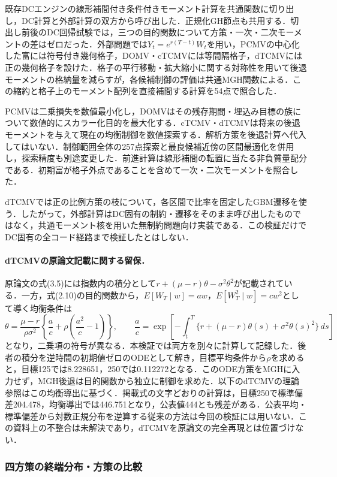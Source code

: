 \documentclass[10pt,a4paper]{article}
\theoremstyle{plain}
\theoremstyle{definition}
\begin{document}
既存DCエンジンの線形補間付き条件付きモーメント計算を共通関数に切り出し，DC計算と外部計算の双方から呼び出した．正規化GH節点も共用する．切出し前後のDC回帰試験では，三つの目的関数について方策・一次・二次モーメントの差はゼロだった．外部問題では$Y_t=e^{r(T-t)}W_t$を用い，PCMVの中心化した富には符号付き幾何格子，DOMV・cTCMVには等間隔格子，dTCMVには正の幾何格子を設けた．格子の平行移動・拡大縮小に関する対称性を用いて後退モーメントの格納量を減らすが，各候補制御の評価は共通MGH関数による．この縮約と格子上のモーメント配列を直接補間する計算を54点で照合した．

PCMVは二乗損失を数値最小化し，DOMVはその残存期間・埋込み目標の族について数値的にスカラー化目的を最大化する．cTCMV・dTCMVは将来の後退モーメントを与えて現在の均衡制御を数値探索する．解析方策を後退計算へ代入してはいない．制御範囲全体の257点探索と最良候補近傍の区間最適化を併用し，探索精度も別途変更した．前進計算は線形補間の転置に当たる非負質量配分である．初期富が格子外点であることを含めて一次・二次モーメントを照合した．

dTCMVでは正の比例方策の枝について，各区間で比率を固定したGBM遷移を使う．したがって，外部計算はDC固有の制約・遷移をそのまま呼び出したものではなく，共通モーメント核を用いた無制約問題向け実装である．この検証だけでDC固有の全コード経路まで検証したとはしない．

\paragraph{dTCMVの原論文記載に関する留保．}
原論文の式(3.5)には指数内の積分として$r+(\mu-r)\theta-\sigma^2\theta^2$が記載されている．一方，式(2.10)の目的関数から，$E[W_T\mid w]=aw$，$E[W_T^2\mid w]=cw^2$として導く均衡条件は
\[
 \theta=\frac{\mu-r}{\rho\sigma^2}
 \left\{\frac{a}{c}+\rho\left(\frac{a^2}{c}-1\right)\right\},
 \qquad
 \frac{a}{c}=\exp\!\left[-\int_t^T
 \{r+(\mu-r)\theta(s)+\sigma^2\theta(s)^2\}\,ds\right]
\]
となり，二乗項の符号が異なる．本検証では両方を別々に計算して記録した．後者の積分を逆時間の初期値ゼロのODEとして解き，目標平均条件から$\rho$を求めると，目標125では8.228651，250では0.112272となる．このODE方策をMGHに入力せず，MGH後退は目的関数から独立に制御を求めた．以下のdTCMVの理論参照はこの均衡導出に基づく．掲載式の文字どおりの計算は，目標250で標準偏差204.478，均衡導出では446.751となり，公表値444とも残差がある．公表平均・標準偏差から対数正規分布を逆算する従来の方法は今回の検証には用いない．この資料上の不整合は未解決であり，dTCMVを原論文の完全再現とは位置づけない．

\subsubsection{四方策の終端分布・方策の比較}
\end{document}
